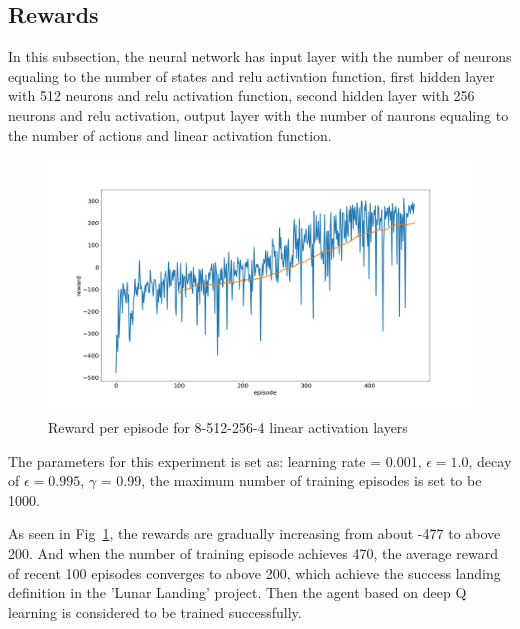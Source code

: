 \documentclass[conference]{IEEEtran}
\begin{document}
\subsection{Rewards}\label{sec:rewards}

In this subsection, the neural network has input layer with the number of neurons equaling to the number of states and relu activation function, first hidden layer with 512 neurons and relu activation function, second hidden layer with 256 neurons and relu activation, output layer with the number of naurons equaling to the number of actions and linear activation function. 

\begin{figure}[ht]
\includegraphics[width=\linewidth]{training_episode_reward.png}
\caption{Reward per episode for 8-512-256-4 linear activation layers}
\label{fig9}
\end{figure}

The parameters for this experiment is set as: learning rate = 0.001, $\epsilon = 1.0$, decay of $\epsilon= 0.995$, $\gamma$ = 0.99, the maximum number of training episodes is set to be 1000.

As seen in Fig~\ref{fig9}, the rewards are gradually increasing from about -477 to above 200. And when the number of training episode achieves 470, the average reward of recent 100 episodes converges to above 200, which achieve the success landing definition in the 'Lunar Landing' project. Then the agent based on deep Q learning is considered to be trained successfully.
\end{document}
